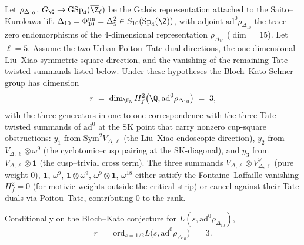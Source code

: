 \begin{theorem}
\label{thm:dl-selmer-rank-delta5}
\ClaimStatusConditional
Let $\rho_{\Delta_{10}}\colon G_\Q\to\mathrm{GSp}_4(\overline\Z_\ell)$
be the Galois representation attached to the Saito--Kurokawa lift
$\Delta_{10}=\Phi_{10}^{\mathrm{un}}=\Delta_5^2\in
S_{10}(\mathrm{Sp}_4(\Z))$, with adjoint
$\mathrm{ad}^0\rho_{\Delta_{10}}$ the trace-zero endomorphisms of the
$4$-dimensional representation $\rho_{\Delta_{10}}$ ($\dim = 15$). Let
$\ell = 5$. Assume the two Urban Poitou--Tate dual directions, the
one-dimensional Liu--Xiao symmetric-square direction, and the
vanishing of the remaining Tate-twisted summands listed below. Under
these hypotheses the Bloch--Kato Selmer group has dimension
\begin{equation}
\label{eq:selmer-rank-value}
 r \;=\; \dim_{\F_5} H^2_f\bigl(\Q,\mathrm{ad}^0\rho_{\Delta_{10}}\bigr) \;=\; 3,
\end{equation}
with the three generators in one-to-one correspondence with the three
Tate-twisted summands of $\mathrm{ad}^0$ at the SK point that carry
nonzero cup-square obstructions:
$y_1$ from $\mathrm{Sym}^2 V_{\Delta,\ell}$ (the Liu--Xiao
endoscopic direction), $y_2$ from $V_{\Delta,\ell}\otimes\omega^9$
(the cyclotomic--cusp pairing at the SK-diagonal), and $y_3$ from
$V_{\Delta,\ell}\otimes\mathbf 1$ (the cusp--trivial cross term). The
three summands $V_{\Delta,\ell}\otimes V_{\Delta,\ell}^\vee$
(pure weight $0$), $\mathbf 1$, $\omega^9$, $\mathbf 1\otimes\omega^9$,
$\omega^9\otimes\mathbf 1$, $\omega^{18}$ either satisfy the
Fontaine--Laffaille vanishing $H^2_f = 0$ (for motivic weights outside
the critical strip) or cancel against their Tate duals via
Poitou--Tate, contributing $0$ to the rank.

Conditionally on the Bloch--Kato conjecture for
$L(s,\mathrm{ad}^0\rho_{\Delta_{10}})$,
\begin{equation}
\label{eq:selmer-bk-conditional}
 r \;=\; \mathrm{ord}_{s = 1/2} L\bigl(s,\mathrm{ad}^0\rho_{\Delta_{10}}\bigr) \;=\; 3.
\end{equation}
\end{theorem}

